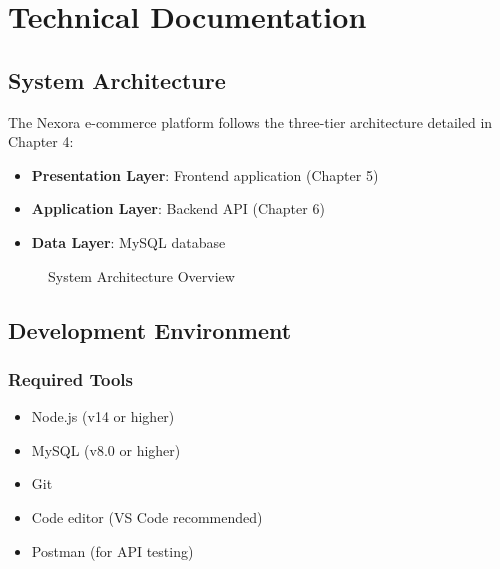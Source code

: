 
\chapter{Technical Documentation}

\section{System Architecture}
The Nexora e-commerce platform follows the three-tier architecture detailed in Chapter 4:
\begin{itemize}
    \item \textbf{Presentation Layer}: Frontend application (Chapter 5)
    \item \textbf{Application Layer}: Backend API (Chapter 6)
    \item \textbf{Data Layer}: MySQL database
\end{itemize}

\begin{figure}[h]
    \centering
    \caption{System Architecture Overview}
    \label{fig:tech-system-architecture}
\end{figure}

\section{Development Environment}
\subsection{Required Tools}
\begin{itemize}
    \item Node.js (v14 or higher)
    \item MySQL (v8.0 or higher)
    \item Git
    \item Code editor (VS Code recommended)
    \item Postman (for API testing)
\end{itemize}

